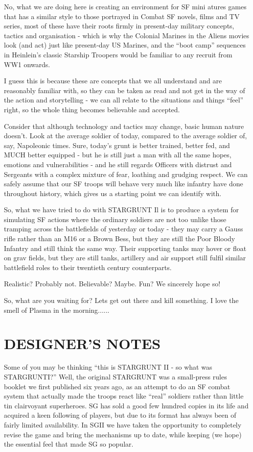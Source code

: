No, what we are doing here is creating an environment for SF mini atures games that has a similar style to those portrayed in Combat SF novels, films and TV series, most of these have their roots firmly in present-day military concepts, tactics and organisation - which is why the Colonial Marines in the Aliens movies look (and act) just like present-day US Marines, and the ``boot camp'' sequences in Heinlein's classic Starship Troopers would be familiar to any recruit from WW1 onwards.

I guess this is because these are concepts that we all understand and are reasonably familiar with, so they can be taken as read and not get in the way of the action and storytelling - we can all relate to the situations and things ``feel'' right, so the whole thing becomes believable and accepted.

Consider that although technology and tactics may change, basic human nature doesn't. Look at the average soldier of today, compared to the average soldier of, say, Napoleonic times. Sure, today's grunt is better trained, better fed, and MUCH better equipped - but he is still just a man with all the same hopes, emotions and vulnerabilities - and he still regards Officers with distrust and Sergeants with a complex mixture of fear, loathing and grudging respect. We can safely assume that our SF troops will behave very much like infantry have done throughout history, which gives us a starting point we can identify with.

So, what we have tried to do with STARGRUNT Il is to produce a system for simulating SF actions where the ordinary soldiers are not too unlike those tramping across the battlefields of yesterday or today - they may carry a Gauss rifle rather than an M16 or a Brown Bess, but they are still the Poor Bloody Infantry and still think the same way. Their supporting tanks may hover or float on grav fields, but they are still tanks, artillery and air support still fulfil similar battlefield roles to their twentieth century counterparts.

Realistic? Probably not. Believable? Maybe. Fun? We sincerely hope so!

So, what are you waiting for? Lets get out there and kill something. I love the smell of Plasma in the morning...... 

\section{DESIGNER'S NOTES}
Some of you may be thinking ``this is STARGRUNT II - so what was STARGRUNTI?'' Well, the original STARGRUNT was a small-press rules booklet we first published six years ago, as an attempt to do an SF combat system that actually made the troops react like ``real'' soldiers rather than little tin clairvoyant superheroes. SG has sold a good few hundred copies in its life and acquired a keen following of players, but due to its format has always been of fairly limited availability. In SGII we have taken the opportunity to completely revise the game and bring the mechanisms up to date, while keeping (we hope) the essential feel that made SG so popular.

